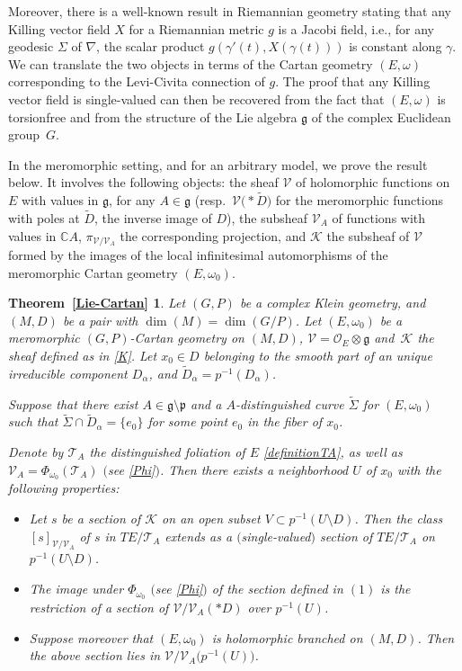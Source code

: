 \documentclass[pdftex]{sigma}
\numberwithin{equation}{section}
\newtheorem*{Theorem-4.2}{Theorem~\ref{Lie-Cartan}}
\begin{document}
 Moreover, there is a well-known result in Riemannian geometry stating that any Killing vector field $X$ for a Riemannian metric $g$ is a Jacobi field, i.e., for any geodesic $\Sigma$ of $\nabla$, the scalar product $g(\gamma'(t),X(\gamma(t)))$ is constant along $\gamma$. We can translate the two objects in terms of the Cartan geometry $(E,\omega)$ corresponding to the Levi-Civita connection of $g$. The proof that any Killing vector field is single-valued can then be recovered from the fact that $(E,\omega)$ is torsionfree and from the structure of the Lie algebra $\mathfrak{g}$ of the complex Euclidean group~$G$.

In the meromorphic setting, and for an arbitrary model, we prove the result below. It involves the following objects: the sheaf $\mathcal{V}$ of holomorphic functions on $E$ with values in $\mathfrak{g}$, for any $A\in \mathfrak{g}$ (resp.\ $\mathcal{V}\bigl(*\tilde{D}\bigr)$ for the meromorphic functions with poles at $\tilde{D}$, the inverse image of $D$), the subsheaf $\mathcal{V}_A$ of functions with values in $\mathbb{C}A$, $\pi_{\mathcal{V}/\mathcal{V}_A}$ the corresponding projection, and $\mathcal{K}$ the subsheaf of $\mathcal{V}$ formed by the images of the local infinitesimal automorphisms of the meromorphic Cartan geometry $(E,\omega_0)$.

\begin{Theorem-4.2}\label{Lie-Cartan-Int}
Let $(G,P)$ be a complex Klein geometry, and $(M,D)$ be a pair with $\dim(M)=\dim(G/P)$. Let $(E,\omega_0)$ be a meromorphic $(G,P)$-Cartan geometry on $(M,D)$, $\mathcal{V}=\mathcal{O}_E\otimes \mathfrak{g}$ and~$\mathcal{K}$ the sheaf defined as in \eqref{K}. Let $x_0 \in D$ belonging to the smooth part of an unique irreducible component $D_\alpha$, and $\tilde{D}_\alpha = p^{-1}(D_\alpha)$.

Suppose that there exist $A\in \mathfrak{g}\setminus \mathfrak{p}$ and a $A$-distinguished curve $\tilde{\Sigma}$ for $(E,\omega_0)$ such that $\tilde{\Sigma}\cap \tilde{D}_\alpha= \{e_0\}$ for some point $e_0$ in the fiber of $x_0$.

Denote by $\mathcal{T}_A$ the distinguished foliation of $E$ \eqref{definitionTA}, as well as $\mathcal{V}_A=\Phi_{\omega_0}(\mathcal{T}_A)$ $($see \eqref{Phi}$)$. Then there exists a neighborhood $U$ of $x_0$ with the following properties:
\begin{itemize}\itemsep=0pt
\item[$(1)$] Let $s$ be a section of $\mathcal{K}$ on an open subset $V\subset p^{-1}(U\setminus D)$. Then the class $[s]_{\mathcal{V}/\mathcal{V}_A}$ of $s$ in $TE/\mathcal{T}_A$ extends as a $($single-valued$)$ section of $TE/\mathcal{T}_A$ on $p^{-1}(U\setminus D)$.
 \item[$(2)$] The image under $\Phi_{\omega_0}$ $($see \eqref{Phi}$)$ of the section defined in $(1)$ is the restriction of a section of $\mathcal{V}/\mathcal{V}_A(* D)$ over $p^{-1}(U)$.
\item[$(3)$] Suppose moreover that $(E,\omega_0)$ is holomorphic branched on $(M,D)$. Then the above section lies in $\mathcal{V}/\mathcal{V}_A\big(p^{-1}(U)\big)$. \end{itemize}
\end{Theorem-4.2}
\end{document}

